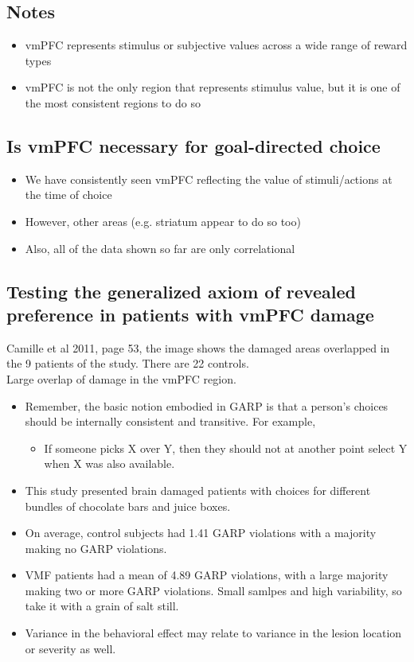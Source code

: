 \subsection{Notes}
\begin{itemize}
    \item vmPFC represents stimulus or subjective values across a wide range of reward types
    \item vmPFC is not the only region that represents stimulus value, but it is one of the most consistent regions to do so
\end{itemize}
\subsection{Is vmPFC necessary for goal-directed choice}
\begin{itemize}
    \item We have consistently seen vmPFC reflecting the value of stimuli/actions at the time of choice
    \item However, other areas (e.g. striatum appear to do so too)
    \item Also, all of the data shown so far are only correlational
\end{itemize}
\subsection{Testing the generalized axiom of revealed preference in patients with vmPFC damage}
Camille et al 2011, page 53, the image shows the damaged areas overlapped in the 9 patients of the study. There are 22 controls.
\\Large overlap of damage in the vmPFC region.
\begin{itemize}
    \item Remember, the basic notion embodied in GARP is that a person's choices should be internally consistent and transitive. For example,
    \begin{itemize}
        \item If someone picks X over Y, then they should not at another point select Y when X was also available.
    \end{itemize}
    \item This study presented brain damaged patients with choices for different bundles of chocolate bars and juice boxes.
    \item On average, control subjects had 1.41 GARP violations with a majority making no GARP violations.
    \item VMF patients had a mean of 4.89 GARP violations, with a large majority making two or more GARP violations. Small samlpes and high variability, so take it with a grain of salt still. 
    \item Variance in the behavioral effect may relate to variance in the lesion location or severity as well.
\end{itemize}

